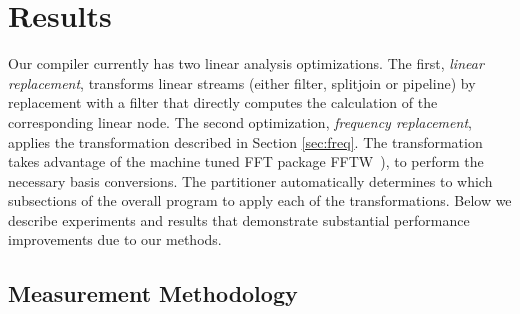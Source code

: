 \section{Results}
\label{sec:results}

Our compiler currently has two linear analysis optimizations. The
first, {\it linear replacement}, transforms linear streams 
(either filter, splitjoin or pipeline) by replacement with a filter 
that directly computes the calculation of the corresponding linear node. 
The second optimization, {\it frequency replacement}, applies the 
transformation described in Section \ref{sec:freq}. 
The transformation takes advantage of the machine tuned FFT package 
FFTW~\cite{frigo99fast}),  to perform the necessary basis conversions.
The partitioner automatically determines to which subsections of the overall program to apply
each of the transformations. Below we describe experiments and results 
that demonstrate substantial performance improvements due to our methods.

\subsection{Measurement Methodology}


